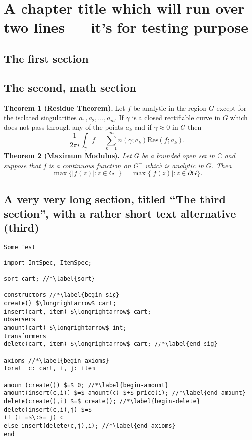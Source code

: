 \documentclass[mscthesis]{usiinfthesis}
\begin{document}
\chapter[Short title]{A chapter title which will run over two lines --- it's for
  testing purpose}

\section{The first section}

 \section{The second, math section}

\textbf{Theorem 1 (Residue Theorem).}
Let $f$ be analytic in the region $G$ except for the isolated singularities $a_1,a_2,\ldots,a_m$. If $\gamma$ is a closed rectifiable curve in $G$ which does not pass through any of the points $a_k$ and if $\gamma\approx 0$ in $G$ then
\[
\frac{1}{2\pi i}\int_\gamma f = \sum_{k=1}^m n(\gamma;a_k) \text{Res}(f;a_k).
\]
\textbf{Theorem 2 (Maximum Modulus).}
\emph{Let $G$ be a bounded open set in $\mathbb{C}$ and suppose that $f$ is a continuous function on $G^-$ which is analytic in $G$. Then}
\[
\max\{|f(z)|:z\in G^-\}=\max \{|f(z)|:z\in \partial G \}.
\]

\section[third]{A very very long section, titled ``The third section'', with
  a rather  short text alternative (third)}

  \texttt{Some Test}
\begin{lstlisting}
import IntSpec, ItemSpec;

sort cart; //*\label{sort}

constructors //*\label{begin-sig}
create() $\longrightarrow$ cart;
insert(cart, item) $\longrightarrow$ cart;
observers
amount(cart) $\longrightarrow$ int;
transformers
delete(cart, item) $\longrightarrow$ cart; //*\label{end-sig}

axioms //*\label{begin-axioms}
forall c: cart, i, j: item 

amount(create()) $=$ 0; //*\label{begin-amount}
amount(insert(c,i)) $=$ amount(c) $+$ price(i); //*\label{end-amount}
delete(create(),i) $=$ create(); //*\label{begin-delete}
delete(insert(c,i),j) $=$
if (i =$\:$= j) c
else insert(delete(c,j),i); //*\label{end-axioms}
end
\end{lstlisting}
\end{document}
